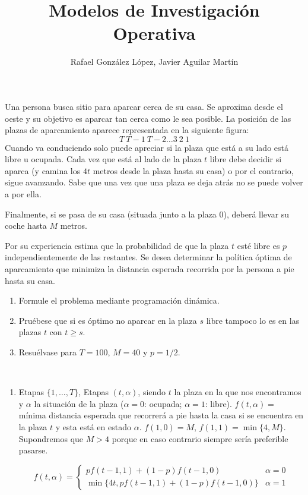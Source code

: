 \documentclass[twoside]{article}
\begin{document}
\title{Modelos de Investigación Operativa}
\author{Rafael González López, Javier Aguilar Martín}
\maketitle

\begin{ejercicio}{1}
Una persona busca sitio para aparcar cerca de su casa. Se aproxima desde el oeste y su objetivo es aparcar tan cerca como le sea posible. La posición de las plazas de aparcamiento aparece representada en la siguiente figura:
$$T\ T-1\ T-2\dots 3\ 2\ 1$$
Cuando va conduciendo solo puede apreciar si la plaza que está a su lado está libre u ocupada. Cada vez que está al lado de la plaza $t$ libre debe decidir si aparca (y camina los $4t$ metros desde la plaza hasta su casa) o por el contrario, sigue avanzando. Sabe que una vez que una plaza se deja atrás no se puede volver a por ella. 

Finalmente, si se pasa de su casa (situada junto a la plaza 0), deberá llevar su coche hasta $M$ metros.

Por su experiencia estima que la probabilidad de que la plaza $t$ esté libre es $p$ independientemente de las restantes. Se desea determinar la política óptima de aparcamiento que minimiza la distancia esperada recorrida por la persona a pie hasta su casa.
\begin{enumerate}
\item Formule el problema mediante programación dinámica.
\item Pruébese que si es óptimo no aparcar en la plaza $s$ libre tampoco lo es en las plazas $t$ con $t\geq s$.
\item Resuélvase para $T=100$, $M=40$ y $p=1/2$.
\end{enumerate}
\newpage
\begin{solucion}\
\begin{enumerate}

\item Etapas $\{1,\dots, T\}$, Etapas $(t,\alpha)$, siendo $t$ la plaza en la que nos encontramos y $\alpha$ la situación de la plaza ($\alpha=0$: ocupada; $\alpha=1$: libre). $f(t,\alpha)=$ mínima distancia esperada que recorrerá a pie hasta la casa si se encuentra en la plaza $t$ y esta está en estado $\alpha$. $f(1,0)=M$, $f(1,1)=\min\{4,M\}$. Supondremos que $M>4$ porque en caso contrario siempre sería preferible pasarse.

$$f(t,\alpha)=\begin{cases}
 pf(t-1,1)+(1-p)f(t-1,0)& \alpha=0\\
 \min\{4t,pf(t-1,1)+(1-p)f(t-1,0)\} & \alpha=1
\end{cases}$$


\end{enumerate}
\end{solucion}
\end{ejercicio}
\end{document}
